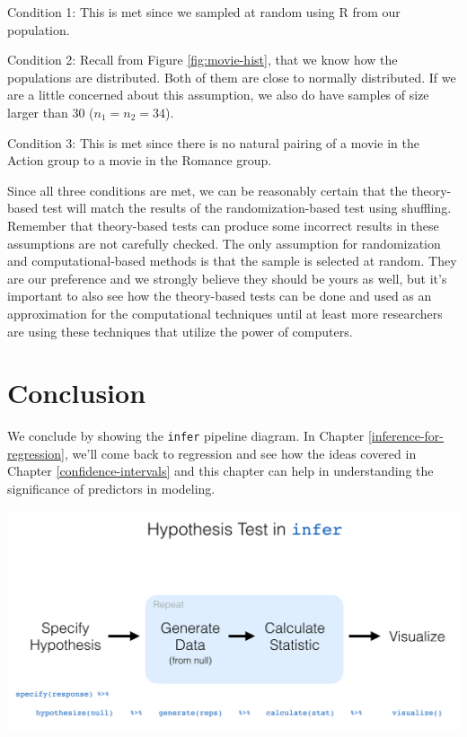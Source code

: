 \documentclass[12pt,]{krantz}
\theoremstyle{definition}
\theoremstyle{definition}
\theoremstyle{definition}
\theoremstyle{remark}
\begin{document}
Condition 1: This is met since we sampled at random using R from our
population.

Condition 2: Recall from Figure \ref{fig:movie-hist}, that we know how
the populations are distributed. Both of them are close to normally
distributed. If we are a little concerned about this assumption, we also
do have samples of size larger than 30 (\(n_1 = n_2 = 34\)).

Condition 3: This is met since there is no natural pairing of a movie in
the Action group to a movie in the Romance group.

Since all three conditions are met, we can be reasonably certain that
the theory-based test will match the results of the randomization-based
test using shuffling. Remember that theory-based tests can produce some
incorrect results in these assumptions are not carefully checked. The
only assumption for randomization and computational-based methods is
that the sample is selected at random. They are our preference and we
strongly believe they should be yours as well, but it's important to
also see how the theory-based tests can be done and used as an
approximation for the computational techniques until at least more
researchers are using these techniques that utilize the power of
computers.

\section{Conclusion}\label{conclusion-8}

We conclude by showing the \texttt{infer} pipeline diagram. In Chapter
\ref{inference-for-regression}, we'll come back to regression and see
how the ideas covered in Chapter \ref{confidence-intervals} and this
chapter can help in understanding the significance of predictors in
modeling.

\begin{center}\includegraphics[width=\textwidth]{images/flowcharts/infer/ht_diagram} \end{center}
\end{document}
